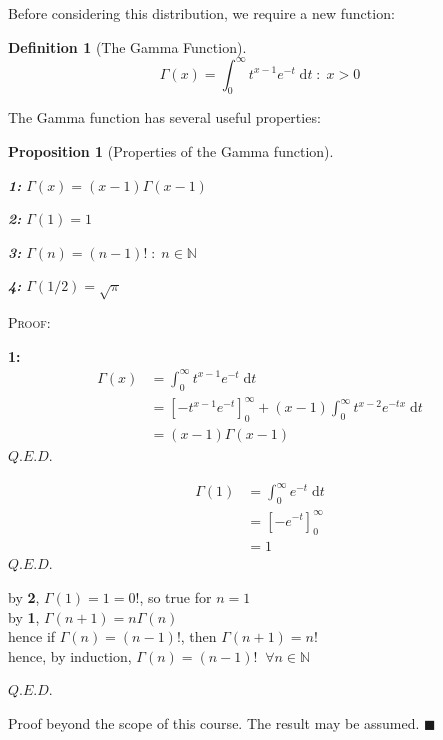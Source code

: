 \documentclass[12pt,a4paper]{article}
\newtheorem{defn}[thm]{Definition}
\newtheorem{prop}[thm]{Proposition}
\begin{document}
Before considering this distribution, we require a new function:

\begin{defn}[The Gamma Function]
$$\Gamma(x) = \int_0^{\infty}\!\!t^{x-1}e^{-t}\;\mathrm{d}t \; : \; x>0$$
\end{defn}

\noindent The Gamma function has several useful properties:

\begin{prop}[Properties of the Gamma function]$\quad$\par
{\bf 1:}  $\Gamma(x) = (x-1)\Gamma(x-1)$\par
{\bf 2:} $\Gamma(1) = 1$\par
{\bf 3:} $\Gamma(n) = (n-1)! \; : \; n \in \mathbb{N}$\par
{\bf 4:} $\Gamma(1/2) = \sqrt \pi$\par
\end{prop}

\noindent\textsc{Proof:}\par
{\bf 1:}
\begin{align*}
\Gamma(x) &= \int_0^\infty \!\! t^{x-1}e^{-t}\;\mathrm{d}t\\
&=\left[ -t^{x-1}e^{-t}\right]_0^\infty + (x-1)\int_0^\infty\!\! t^{x-2}e^{-tx}\;\mathrm{d}t\\
&= (x-1)\Gamma(x-1)
\end{align*}
\hfill$Q.E.D.$

\begin{align*}
\Gamma(1) &= \int_0^\infty \!\! e^{-t}\;\mathrm{d}t\\
&= \left[-e^{-t}\right]_0^\infty\\
&= 1
\end{align*}
\hfill$Q.E.D.$

\begin{center}
by {\bf 2}, $\Gamma(1) = 1 = 0!$, so true for $n=1$\\
by {\bf 1}, $\Gamma(n+1) = n\Gamma(n)$\\
hence if $\Gamma(n)=(n-1)!$, then $\Gamma(n+1) = n!$\\
hence, by induction, $\Gamma(n) = (n-1)! \;\; \forall n \in \mathbb{N}$
\end{center}
\hfill$Q.E.D.$

\par
\indent Proof beyond the scope of this course. The result may be assumed.
\hfill $\blacksquare$\par
\vspace{1cm}
\end{document}
